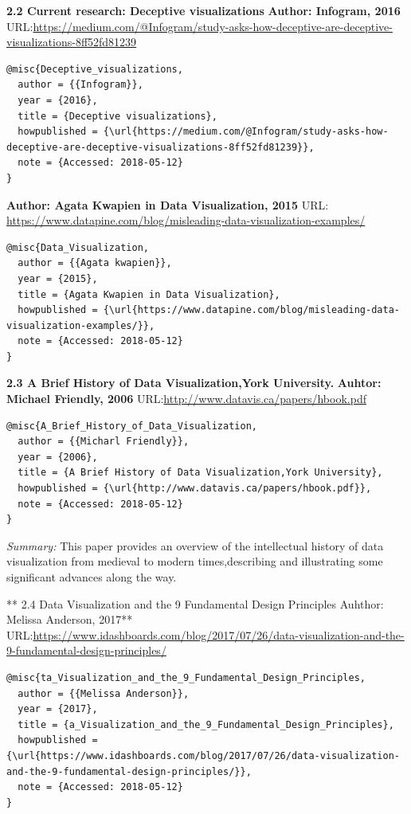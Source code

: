 \documentclass[]{book}
\theoremstyle{definition}
\theoremstyle{definition}
\theoremstyle{definition}
\theoremstyle{remark}
\begin{document}
\textbf{2.2 Current research: Deceptive visualizations} \textbf{Author:
Infogram, 2016}
URL:\url{https://medium.com/@Infogram/study-asks-how-deceptive-are-deceptive-visualizations-8ff52fd81239}
\citep{Deceptive_visualization}

\begin{verbatim}
@misc{Deceptive_visualizations,
  author = {{Infogram}},
  year = {2016},
  title = {Deceptive visualizations},
  howpublished = {\url{https://medium.com/@Infogram/study-asks-how-deceptive-are-deceptive-visualizations-8ff52fd81239}},
  note = {Accessed: 2018-05-12}
}
\end{verbatim}

\textbf{Author: Agata Kwapien in Data Visualization, 2015} URL:
\url{https://www.datapine.com/blog/misleading-data-visualization-examples/}
\citep{Data_Visualization}

\begin{verbatim}
@misc{Data_Visualization,
  author = {{Agata kwapien}},
  year = {2015},
  title = {Agata Kwapien in Data Visualization},
  howpublished = {\url{https://www.datapine.com/blog/misleading-data-visualization-examples/}},
  note = {Accessed: 2018-05-12}
}
\end{verbatim}

\textbf{2.3 A Brief History of Data Visualization,York University.}
\textbf{Auhtor: Michael Friendly, 2006}
URL:\url{http://www.datavis.ca/papers/hbook.pdf}
\citep{A_Brief_History_of_Data_Visualization}

\begin{verbatim}
@misc{A_Brief_History_of_Data_Visualization,
  author = {{Micharl Friendly}},
  year = {2006},
  title = {A Brief History of Data Visualization,York University},
  howpublished = {\url{http://www.datavis.ca/papers/hbook.pdf}},
  note = {Accessed: 2018-05-12}
}
\end{verbatim}

\emph{Summary: } This paper provides an overview of the intellectual
history of data visualization from medieval to modern times,describing
and illustrating some significant advances along the way.

** 2.4 Data Visualization and the 9 Fundamental Design
Principles\textbf{ }Auhthor: Melissa Anderson, 2017**
URL:\url{https://www.idashboards.com/blog/2017/07/26/data-visualization-and-the-9-fundamental-design-principles/}
\citep{Data_Visualization_and_the_9_Fundamental_Design_Principles}

\begin{verbatim}
@misc{ta_Visualization_and_the_9_Fundamental_Design_Principles,
  author = {{Melissa Anderson}},
  year = {2017},
  title = {a_Visualization_and_the_9_Fundamental_Design_Principles},
  howpublished = {\url{https://www.idashboards.com/blog/2017/07/26/data-visualization-and-the-9-fundamental-design-principles/}},
  note = {Accessed: 2018-05-12}
}
\end{verbatim}
\end{document}
